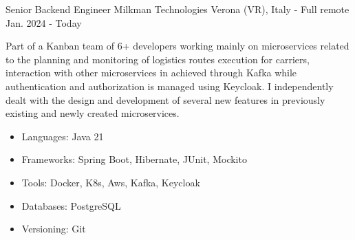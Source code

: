

\begin{cventries}

  \cventry
    {Senior Backend Engineer} %
    {Milkman Technologies} %
    {Verona (VR), Italy - Full remote} %
    {Jan. 2024 - Today} %
    {
        Part of a Kanban team of 6+ developers working mainly on microservices related to the planning and monitoring of logistics routes execution for carriers, interaction with other microservices in achieved through Kafka while authentication and authorization is managed using Keycloak.
        I independently dealt with the design and development of several new features in previously existing and newly created microservices.
        \begin{itemize}
      		\item {Languages: Java 21}
      		\item {Frameworks: Spring Boot, Hibernate, JUnit, Mockito}
            \item {Tools: Docker, K8s, Aws, Kafka, Keycloak}
      		\item {Databases: PostgreSQL}
      		\item {Versioning: Git}
      	\end{itemize}
    }


\end{cventries}
